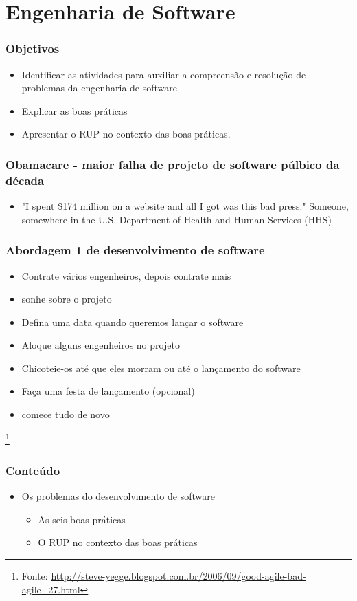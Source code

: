 
\section{Engenharia de Software}

\begin{frame}
\frametitle{Objetivos}
\begin{itemize}
 \item Identificar as atividades para auxiliar a compreensão e resolução de problemas da engenharia de software
 \item Explicar as boas práticas
 \item Apresentar o RUP no contexto das boas práticas.
\end{itemize}
\end{frame}

\begin{frame}
 \frametitle{Obamacare - maior falha de projeto de software púlbico da década}
 \begin{itemize}
  \item "I spent \$174 million on a website and all I got was this bad press."
Someone, somewhere in the U.S. Department of Health and Human Services (HHS)
 \end{itemize}
\end{frame}

\begin{frame}
 \frametitle{Abordagem 1 de desenvolvimento de software}
 \begin{itemize}
  \item Contrate vários engenheiros, depois contrate mais
  \item sonhe sobre o projeto
  \item Defina uma data quando queremos lançar o software
  \item Aloque alguns engenheiros no projeto
  \item Chicoteie-os até que eles morram ou até o lançamento do software
  \item Faça uma festa de lançamento (opcional)
  \item comece tudo de novo
 \end{itemize}
 \footnote{Fonte: \url{http://steve-yegge.blogspot.com.br/2006/09/good-agile-bad-agile_27.html}}
\end{frame}



\begin{frame}
 \frametitle{Conteúdo}
 \begin{itemize}
  \item Os problemas do desenvolvimento de software
  \begin{itemize}
   \item As seis boas práticas
   \item O RUP no contexto das boas práticas
  \end{itemize}
 \end{itemize}
\end{frame}


